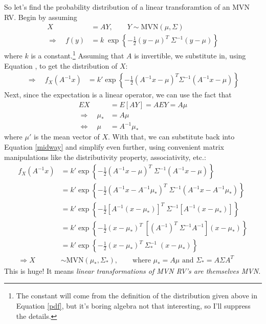 \documentclass[12pt]{article}
\theoremstyle{plain}
\theoremstyle{definition}
\theoremstyle{remark}
\begin{document}
So let's find the probability distribution of a linear transforamtion
of an MVN RV. Begin by assuming
\begin{align*}
    X &= A{Y}, \qquad {Y} \sim
	\text{MVN}(\mu, \Sigma) \\
    \Rightarrow \quad f(y) &= k \; \exp\left\{-\frac{1}{2} (y - \mu)^T
	\; \Sigma^{-1} (y-\mu)\right\}
\end{align*}
where $k$ is a constant.\footnote{The constant will come from the
definition of the distribution given above in Equation \ref{pdf}, but
it's boring algebra not that interesting, so I'll suppress the details.}
Assuming that $A$ is invertible, we substitute in, using Equation
, to get the distribution of $X$:
\begin{align}
    \label{midway}
    \Rightarrow \quad f_X(A^{-1}x) &= k' \exp\left\{-\frac{1}{2} (A^{-1}x - \mu)^T
	\Sigma^{-1} (A^{-1}x-\mu)\right\}
\end{align}
Next, since the expectation is a linear operator, we can use the fact
that
\begin{align*}
    EX &= E[A{Y}] = A E{Y} = A \mu \\
    \Rightarrow \quad \mu_* &= A \mu \\
    \Leftrightarrow \quad \mu &= A^{-1} \mu_*
\end{align*}
where $\mu'$ is the mean vector of $X$.  With that, we
can substitute back into Equation \ref{midway} and simplify even
further, using convenient matrix manipulations like the distributivity
property, associativity, etc.:
\begin{align*}
    f_X(A^{-1}x) &= k' \exp\left\{-\frac{1}{2} (A^{-1}x - \mu)^T \;
	\Sigma^{-1} (A^{-1}x-\mu)\right\} \\
    &= k' \exp\left\{-\frac{1}{2} (A^{-1}x - A^{-1}\mu_*)^T \;
	\Sigma^{-1} (A^{-1}x-A^{-1}\mu_*)\right\} \\
    &= k' \exp\left\{-\frac{1}{2} [A^{-1}(x - \mu_*)]^T \;
	\Sigma^{-1} [A^{-1}(x-\mu_*)]\right\} \\
    &= k' \exp\left\{-\frac{1}{2} (x - \mu_*)^T \; [(A^{-1})^T \;
	\Sigma^{-1} A^{-1}] (x-\mu_*)\right\} \\
    &= k' \exp\left\{-\frac{1}{2} (x - \mu_*)^T \;
	\Sigma_*^{-1} \; (x-\mu_*)\right\} \\
    \Rightarrow X &\sim  \text{MVN}(\mu_*, \Sigma_*),
    \qquad \text{where $\mu_* = A\mu$ and $\Sigma_* = A\Sigma A^T $}
\end{align*}
This is huge! It means \emph{linear transformations of MVN
RV's are themselves MVN.}
\end{document}
